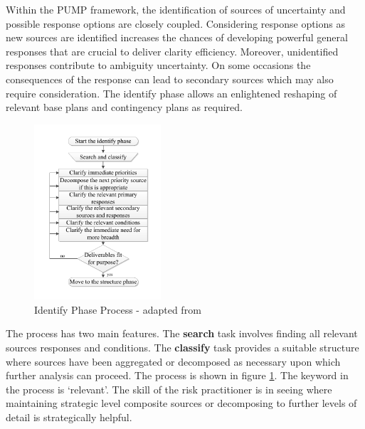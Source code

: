 Within the PUMP framework, the identification of sources of uncertainty and possible response options are closely coupled. 
Considering response options as new sources are identified increases the chances of developing powerful general responses that are crucial to deliver clarity efficiency. 
Moreover, unidentified responses contribute to ambiguity uncertainty. 
On some occasions the consequences of the response can lead to secondary sources which may also require consideration.
The identify phase allows an enlightened reshaping of relevant base plans and contingency plans as required.

\begin{figure}[!h]
  \centering
    \includegraphics[width = 0.42\textwidth]{./Figures/Identify.pdf} 
\caption{Identify Phase Process - adapted from \cite{chapman}}
\label{Figure:Identify}
\end{figure}

The process has two main features. 
The \textbf{search} task involves finding all relevant sources responses and conditions. 
The \textbf{classify} task provides a suitable structure where sources have been aggregated or decomposed as necessary upon which further analysis can proceed.
The process is shown in figure \ref{Figure:Identify}.
The keyword in the process is `relevant'. 
The skill of the risk practitioner is in seeing where maintaining strategic level composite sources or decomposing to further levels of detail is strategically helpful.




